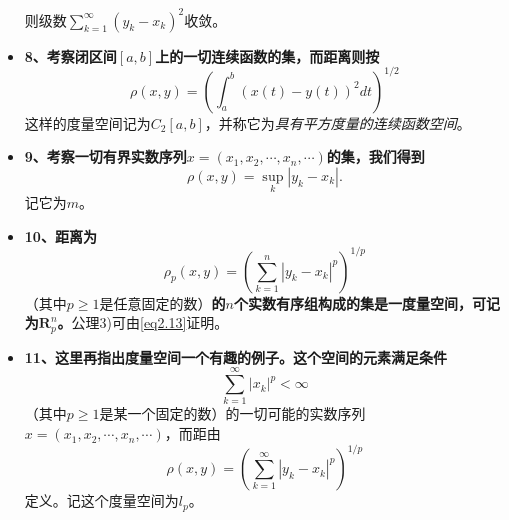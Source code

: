 \begin{itemize}
\[	\]
	则级数$\sum\limits_{k=1}^{\infty}(y_k-x_k)^2$收敛。
	\item \textbf{8、考察闭区间$[a,b]$上的一切连续函数的集，而距离则按}
	\begin{equation}
	\label{eq2.8}
	\rho(x,y)=\left(\int_a^b(x(t)-y(t))^2dt\right)^{1/2}
	\end{equation}
	这样的度量空间记为$C_2[a,b]$，并称它为\textcolor[rgb]{1,0,0}{\emph{具有平方度量的连续函数空间}}。
	\item \textbf{9、考察一切有界实数序列$x=(x_1,x_2,\cdots,x_n,\cdots)$的集，我们得到}
	\begin{equation}
	\label{eq2.11}
	\rho(x,y)=\sup\limits_k|y_k-x_k|.
	\end{equation}
	记它为$m$。
	\item \textbf{10、距离为}
	\begin{equation}
	\label{eq2.12}
	\rho_p(x,y)=\left(\sum\limits_{k=1}^{n}|y_k-x_k|^p\right)^{1/p}
	\end{equation}
	（其中$p \geqslant 1$是任意固定的数）\textbf{的$n$个实数有序组构成的集是一度量空间，可记为$\mathbf{R}_p^n$。}公理3)可由\cref{eq2.13}证明。
	\item \textbf{11、这里再指出度量空间一个有趣的例子。这个空间的元素满足条件}
	\[
	\sum\limits_{k=1}^{\infty}|x_k|^p < \infty
	\]
	（其中$p \geqslant 1$是某一个固定的数）的一切可能的实数序列$x=(x_1,x_2,\cdots,x_n,\cdots)$，而距由
	\begin{equation}
	\label{eq2.18}
	\rho(x,y)=\left(\sum\limits_{k=1}^{\infty}|y_k-x_k|^p\right)^{1/p}
	\end{equation}
	定义。记这个度量空间为$l_p$。
\end{itemize}
